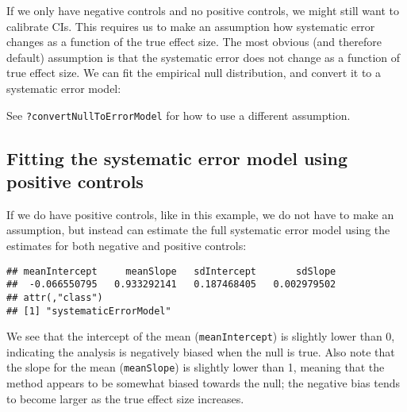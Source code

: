 \documentclass[]{article}
\newenvironment{Shaded}{\begin{snugshade}}{\end{snugshade}}
\newcommand{\KeywordTok}[1]{\textcolor[rgb]{0.13,0.29,0.53}{\textbf{#1}}}
\newcommand{\NormalTok}[1]{#1}
\newcommand{\OperatorTok}[1]{\textcolor[rgb]{0.81,0.36,0.00}{\textbf{#1}}}
\newcommand{\StringTok}[1]{\textcolor[rgb]{0.31,0.60,0.02}{#1}}
\begin{document}
If we only have negative controls and no positive controls, we might
still want to calibrate CIs. This requires us to make an assumption how
systematic error changes as a function of the true effect size. The most
obvious (and therefore default) assumption is that the systematic error
does not change as a function of true effect size. We can fit the
empirical null distribution, and convert it to a systematic error model:

\begin{Shaded}
\end{Shaded}

See \texttt{?convertNullToErrorModel} for how to use a different
assumption.

\hypertarget{fitting-the-systematic-error-model-using-positive-controls}{%
\subsection{Fitting the systematic error model using positive
controls}\label{fitting-the-systematic-error-model-using-positive-controls}}

If we do have positive controls, like in this example, we do not have to
make an assumption, but instead can estimate the full systematic error
model using the estimates for both negative and positive controls:

\begin{Shaded}
\end{Shaded}

\begin{verbatim}
## meanIntercept     meanSlope   sdIntercept       sdSlope 
##  -0.066550795   0.933292141   0.187468405   0.002979502 
## attr(,"class")
## [1] "systematicErrorModel"
\end{verbatim}

We see that the intercept of the mean (\texttt{meanIntercept}) is
slightly lower than 0, indicating the analysis is negatively biased when
the null is true. Also note that the slope for the mean
(\texttt{meanSlope}) is slightly lower than 1, meaning that the method
appears to be somewhat biased towards the null; the negative bias tends
to become larger as the true effect size increases.
\end{document}
